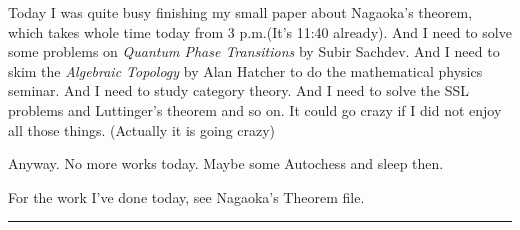 Today I was quite busy finishing my small paper about Nagaoka's theorem, which takes whole time today from 3 p.m.(It's 11:40 already). And I need to solve some problems on \textit{Quantum Phase Transitions} by Subir Sachdev. And I need to skim the \textit{Algebraic Topology} by Alan Hatcher to do the mathematical physics seminar. And I need to study category theory. And I need to solve the SSL problems and Luttinger's theorem and so on. It could go crazy if I did not enjoy all those things. (Actually it is going crazy)

Anyway. No more works today. Maybe some Autochess and sleep then.

For the work I've done today, see Nagaoka's Theorem file.
\noindent\rule{\textwidth}{1pt}
\newline
